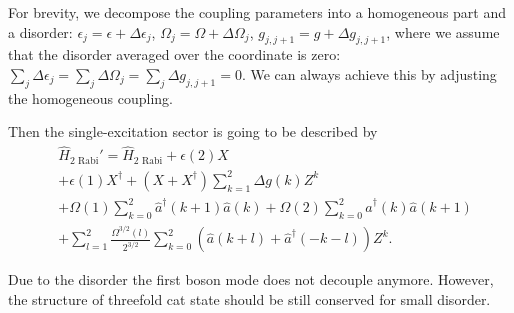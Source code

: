 \documentclass[reprint, aps, prx, amsmath, amssymb, longbibliography, superscriptaddress]{revtex4-2}
\begin{document}
For brevity, we decompose the coupling parameters into a homogeneous part and a disorder: $\epsilon_j = \epsilon + \Delta \epsilon_j$, $\Omega_j = \Omega + \Delta \Omega_j$, $g_{j,j+1} = g + \Delta g_{j,j+1}$, where we assume that the disorder averaged over the coordinate is zero: $\sum_j \Delta \epsilon_j =  \sum_j \Delta \Omega_j = \sum_j \Delta g_{j,j+1} =0$. We can always achieve this by adjusting the homogeneous coupling.

Then the single-excitation sector is going to be described by
\begin{equation}
\begin{aligned}
    &\hat H_{\text{2 Rabi}}' = \hat H_{\text{2 Rabi}} + \epsilon(2) X \\
    &+\epsilon(1)  X^{\dagger} + (X + X^{\dagger}) \sum\limits_{k=1}^2 \Delta g(k) Z^k\\
    &+ \Omega(1) \sum\limits_{k=0}^2 \hat a^{\dagger}(k+1) \hat a(k) + \Omega(2) \sum\limits_{k=0}^2 \hat a^{\dagger}(k) \hat a(k+1) \\
    &+ \sum\limits_{l=1}^2 \frac{\Omega^{3/2}(l)}{2^{3/2}} \sum\limits_{k=0}^2 (\hat a(k+l) + \hat a^{\dagger}(-k-l)) Z^k.
\end{aligned}
\end{equation}

Due to the disorder the first boson mode does not decouple anymore. However, the structure of threefold cat state should be still conserved for small disorder. 




\end{document}
